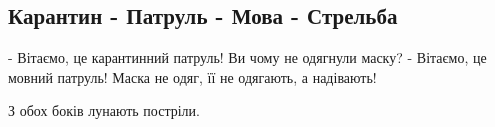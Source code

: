  
 
 
 
 

\subsection{Карантин - Патруль - Мова - Стрельба}
\label{sec:06_04_2021.fb.levchenko_tatjana.1.patrul_mova_karantin}

- Вітаємо, це карантинний патруль! Ви чому не одягнули маску?
- Вітаємо, це мовний патруль! Маска не одяг, її не одягають, а надівають!

З обох боків лунають постріли.
